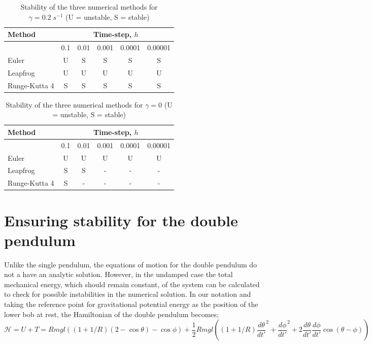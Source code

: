 \documentclass[10pt,a4paper]{article}
\begin{document}
\begin{table}[h!]
\label{tab:Results}
\caption{Stability of the three numerical methods for $\gamma = 0.2\; s^{-1}$ (U = unstable, S = stable)}
\centering
\begin{tabular}{l c c c c c}
\hline\hline
Method  & \multicolumn{5}{c}{
Time-step, $h$} \\ [1ex]
\hline
\phantom{0} & 0.1 & 0.01 & 0.001 & 0.0001 & 0.00001 \\ [1ex]
Euler & U & S & S & S & S \\
Leapfrog & U & U & U & U & U \\
Runge-Kutta 4 & S & S & S & S & S \\ [1ex]
\hline
\end{tabular}
\label{table:nonlin}
\end{table}

\begin{table}[h!]
\label{tab:ResultsUndamped}
\caption{Stability of the three numerical methods for $\gamma = 0$ (U = unstable, S = stable)}
\centering
\begin{tabular}{l c c c c c}
\hline\hline
Method  & \multicolumn{5}{c}{
Time-step, $h$} \\ [1ex]
\hline
\phantom{0} & 0.1 & 0.01 & 0.001 & 0.0001 & 0.00001 \\ [1ex]
Euler & U & U & U & U & U \\
Leapfrog & S & S & - & - & - \\
Runge-Kutta 4 & S & - & - & - & - \\ [1ex]
\hline
\end{tabular}
\label{table:nonlin}
\end{table}
 
\section{Ensuring stability for the double pendulum}
Unlike the single pendulum, the equations of motion for the double pendulum do not a have an analytic solution. However, in the undamped case the total mechanical energy, which should remain constant, of the system can be calculated to check for possible instabilities in the numerical solution. In our notation and taking the reference point for gravitational potential energy as the position of the lower bob at rest, the Hamiltonian of the double pendulum becomes;
\begin{equation}
\mathcal{H} = U + T = Rmgl((1+1/R)(2-\cos\theta)-\cos\phi) + \frac{1}{2}Rmgl((1+1/R)\frac{d\theta}{dt'}^2 +\frac{d\phi}{dt'}^2 + 2\frac{d\theta}{dt'}\frac{d\phi}{dt'}\cos(\theta-\phi))
\end{equation}
\end{document}

